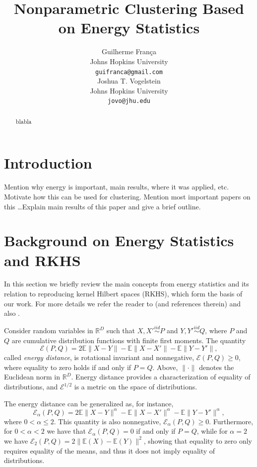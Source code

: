 \documentclass{article}
\title{Nonparametric Clustering Based on Energy Statistics}
\author{
Guilherme Fran\c ca \\
Johns Hopkins University\\
\texttt{guifranca@gmail.com} \\
\And
Joshua T. Vogelstein \\
Johns Hopkins University\\
\texttt{jovo@jhu.edu}
}
\newcommand\Energy{\mathcal{E}}
\newcommand\E{\mathbb{E}}
\begin{document}
\maketitle

\begin{abstract}
blabla
\end{abstract}



\section{Introduction}

Mention why energy is important, main results, where it was applied, etc.
Motivate how this can be used for clustering. Mention most important
papers on this \ldots Explain main results of this paper and give a brief
outline.


\section{Background on Energy Statistics and RKHS}
\label{sec:background}

In this section we briefly review the main concepts from energy
statistics and its relation to reproducing kernel Hilbert spaces 
(RKHS), which form the basis of our work.
For more details we refer the reader
to 
\cite{Szkely2013} 
(and references therein) and also \cite{Sejdinovic2013}.

Consider random variables in $\mathbb{R}^D$ 
such that $X,X' \stackrel{iid}{\sim} P$ and 
$Y,Y' \stackrel{iid}{\sim} Q$, where $P$ and $Q$ are cumulative
distribution functions with finite first moments. 
The quantity \cite{Szkely2013}
\begin{equation}\label{eq:energy}
\Energy(P, Q) = 2 \E \| X - Y\| - \E \| X - X' \| - \E \| Y - Y' \|,
\end{equation}
called \emph{energy distance}, 
is rotational invariant and nonnegative, $\Energy(P,Q) \ge 0$, where
equality
to zero holds if and only if $P = Q$.
Above, $\| \cdot \|$ denotes the
Euclidean norm in $\mathbb{R}^D$. 
Energy distance
provides a characterization of equality of distributions, and
$\Energy^{1/2}$ is
a metric on the space of distributions.

The energy distance can be generalized as, for instance,
\begin{equation}\label{eq:energy2}
\Energy_\alpha(P, Q) = 2 \E \| X - Y\|^{\alpha} - \E \| X - X' \|^{\alpha} - 
\E \| Y - Y' \|^{\alpha},
\end{equation}
where $0<\alpha\le 2$. This quantity is also nonnegative,
$\Energy_\alpha(P,Q) \ge 0$. Furthermore, for $0<\alpha<2$ we have that
$\Energy_\alpha(P,Q) = 0$ if and only if $P=Q$, while for $\alpha=2$ 
we have $\Energy_2(P,Q) = 2\| \E(X) - \E(Y) \|^2$, showing that
equality to zero only requires
equality of the means, and thus it does not imply equality of distributions.
\end{document}

